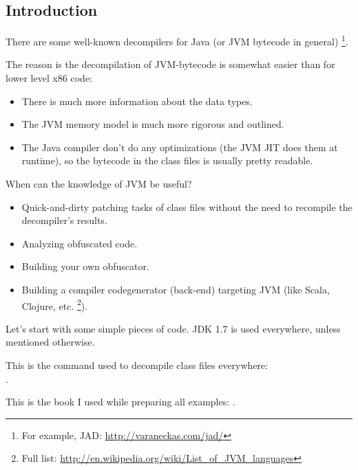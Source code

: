 \subsection{Introduction}

\newcommand{\JADURL}{\url{http://varaneckas.com/jad/}}

There are some well-known decompilers for Java (or \ac{JVM} bytecode in general)
\footnote{For example, JAD: \JADURL}.

The reason is the decompilation of \ac{JVM}-bytecode is somewhat easier 
than for lower level x86 code:

\begin{itemize}
\item There is much more information about the data types.
\item The \ac{JVM} memory model is much more rigorous and outlined.
\item The Java compiler don't do any optimizations (the \ac{JVM} \ac{JIT} does them at runtime),
      so the bytecode in the class files is usually pretty readable.
      
\end{itemize}

When can the knowledge of \ac{JVM} be useful?

\newcommand{\URLListOfJVMLangs}{\url{http://en.wikipedia.org/wiki/List_of_JVM_languages}}

\begin{itemize}
\item Quick-and-dirty patching tasks of class files without the need to recompile the decompiler's results.
\item Analyzing obfuscated code.
\item Building your own obfuscator.
\item Building a compiler codegenerator (back-end) targeting \ac{JVM} (like Scala, Clojure, etc.
      \footnote{Full list: \URLListOfJVMLangs}).
      
\end{itemize}

Let's start with some simple pieces of code.
JDK 1.7 is used everywhere, unless mentioned otherwise.

This is the command used to decompile class files everywhere:\\
.

This is the book I used while preparing all examples: \JavaBook.

